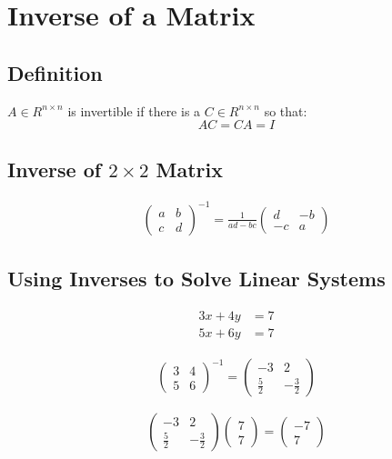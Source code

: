 \section{Inverse of a Matrix}
\subsection{Definition}
\begin{definition}
    \(A \in R^{n\times n}\) is invertible if there is a \(C \in R^{n\times n}\) so that:
    \[AC = CA = I\]
\end{definition}

\subsection{Inverse of \(2\times 2 \) Matrix}
\begin{align}
    \begin{pmatrix}
        a & b \\
        c & d
    \end{pmatrix}^{-1} = \frac{1}{ad - bc}\begin{pmatrix}
        d & -b \\
        -c & a
    \end{pmatrix}
\end{align}

\subsection{Using Inverses to Solve Linear Systems}
\begin{align}
    3 x + 4 y &= 7 \\
    5 x + 6 y &= 7
\end{align}

\begin{align}
    \begin{pmatrix}
        3 & 4 \\
        5 & 6
    \end{pmatrix}^{-1} = \begin{pmatrix}
        -3 & 2 \\
        \frac{5}{2} & -\frac{3}{2}
    \end{pmatrix}
\end{align}

\begin{equation}
    \begin{pmatrix}
        -3 & 2 \\
        \frac{5}{2} & -\frac{3}{2}
    \end{pmatrix} \begin{pmatrix}
        7 \\ 7
    \end{pmatrix} = \begin{pmatrix}
        -7 \\ 7
    \end{pmatrix}
\end{equation}

